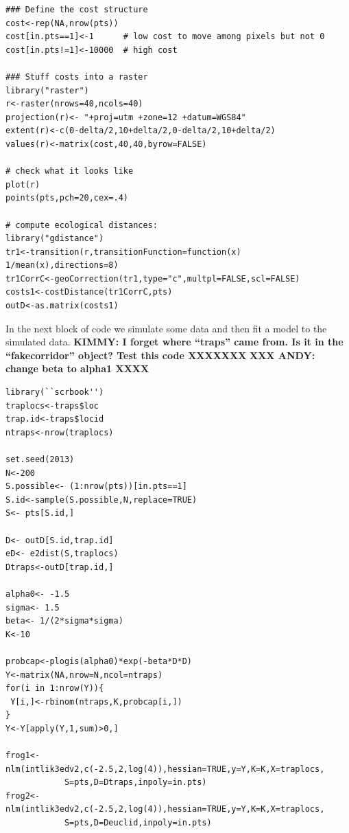 {\small
\begin{verbatim}
### Define the cost structure
cost<-rep(NA,nrow(pts))
cost[in.pts==1]<-1      # low cost to move among pixels but not 0
cost[in.pts!=1]<-10000  # high cost

### Stuff costs into a raster
library("raster")
r<-raster(nrows=40,ncols=40)
projection(r)<- "+proj=utm +zone=12 +datum=WGS84"
extent(r)<-c(0-delta/2,10+delta/2,0-delta/2,10+delta/2)
values(r)<-matrix(cost,40,40,byrow=FALSE)

# check what it looks like
plot(r)
points(pts,pch=20,cex=.4)

# compute ecological distances:
library("gdistance")
tr1<-transition(r,transitionFunction=function(x) 1/mean(x),directions=8)
tr1CorrC<-geoCorrection(tr1,type="c",multpl=FALSE,scl=FALSE)
costs1<-costDistance(tr1CorrC,pts)
outD<-as.matrix(costs1)
\end{verbatim}
}

In the next block of code we simulate some data and then fit a model
to the simulated data. {\bf KIMMY: I forget where ``traps'' came
  from. Is it in the ``fakecorridor'' object? Test this code XXXXXXX}
{\bf XXX ANDY: change beta to alpha1 XXXX}
{\small
\begin{verbatim}
library(``scrbook'')
traplocs<-traps$loc
trap.id<-traps$locid
ntraps<-nrow(traplocs)

set.seed(2013)
N<-200
S.possible<- (1:nrow(pts))[in.pts==1]
S.id<-sample(S.possible,N,replace=TRUE)
S<- pts[S.id,]

D<- outD[S.id,trap.id]
eD<- e2dist(S,traplocs)
Dtraps<-outD[trap.id,]

alpha0<- -1.5
sigma<- 1.5
beta<- 1/(2*sigma*sigma)
K<-10

probcap<-plogis(alpha0)*exp(-beta*D*D)
Y<-matrix(NA,nrow=N,ncol=ntraps)
for(i in 1:nrow(Y)){
 Y[i,]<-rbinom(ntraps,K,probcap[i,])
}
Y<-Y[apply(Y,1,sum)>0,]

frog1<-nlm(intlik3edv2,c(-2.5,2,log(4)),hessian=TRUE,y=Y,K=K,X=traplocs,
            S=pts,D=Dtraps,inpoly=in.pts)
frog2<-nlm(intlik3edv2,c(-2.5,2,log(4)),hessian=TRUE,y=Y,K=K,X=traplocs,
            S=pts,D=Deuclid,inpoly=in.pts)
\end{verbatim}
}

